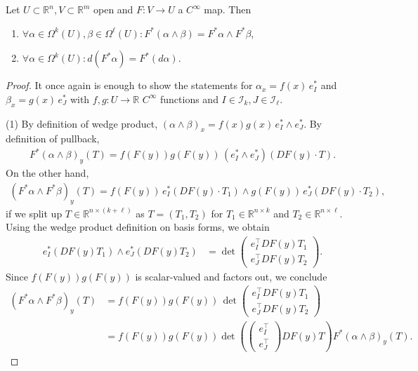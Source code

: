 \begin{prop}\label{prop:pullback-commutes}
	Let $U \subset \mathbb{R}^{n}, V \subset \mathbb{R}^{m}$ open and $F: V \to U$ a $C^{\infty}$ map. Then
	\begin{enumerate}
		\item $\forall \alpha \in \Omega^{k}(U), \beta \in \Omega^{\ell}(U): F^*(\alpha \wedge \beta ) = F^*\alpha \wedge F^*\beta $,
		\item $\forall \alpha \in \Omega^{k}(U): d(F^*\alpha ) = F^*(d \alpha )$.
	\end{enumerate}
\end{prop}
\begin{proof}
	It once again is enough to show the statements for $\alpha_{x} = f(x) \,e_{I}^*$ and $\beta_{x} = g(x) \, e_{J}^*$ with $f,g: U \to \mathbb{R}$ $C^{\infty}$ functions and $I \in \mathcal{I}_{k}, J \in \mathcal{I}_{\ell}$.

	(1) By definition of wedge product, $(\alpha \wedge \beta )_{x} = f(x)g(x)\, e_{I}^* \wedge e_{J}^*$.
	By definition of pullback,
	\begin{align*}
		F^*(\alpha \wedge \beta)_y(T)
		= f(F(y))g(F(y)) \, (e_{I}^* \wedge e_{J}^*)(DF(y)\cdot T).
	\end{align*}
	On the other hand,
	\begin{align*}
		(F^*\alpha \wedge F^*\beta )_y(T)
		= f(F(y)) \, e_{I}^*(DF(y)\cdot T_{1}) \wedge g(F(y)) \, e_{J}^*(DF(y)\cdot T_{2}),
	\end{align*}
	if we split up $T \in \mathbb{R}^{n \times (k+\ell)}$ as $T = (T_{1}, T_{2})$ for $T_{1} \in \mathbb{R}^{n \times k}$ and $T_{2} \in \mathbb{R}^{n \times \ell}$. Using the wedge product definition on basis forms, we obtain
	\begin{align*}
		e_{I}^*(DF(y) T_{1}) \wedge e_{J}^*(DF(y) T_{2})
		 & =
		\det\!\begin{pmatrix}
			      e_{I}^\top DF(y)T_{1} \\
			      e_{J}^\top DF(y)T_{2}
		      \end{pmatrix}.
	\end{align*}
	Since $f(F(y))g(F(y))$ is scalar-valued and factors out, we conclude
	\begin{align*}
		(F^*\alpha \wedge F^*\beta )_y(T)
		 & = f(F(y))g(F(y)) \,
		\det\!\begin{pmatrix}
			      e_{I}^\top DF(y) T_{1} \\
			      e_{J}^\top DF(y) T_{2}
		      \end{pmatrix}
		\\ &
		=
		f(F(y)) g(F(y)) \det \! \left(
		\begin{pmatrix}
			e_{I}^\top \\
			e_{J}^\top
		\end{pmatrix}
		DF(y)T \right)
		F^*(\alpha \wedge \beta)_y(T).
	\end{align*}


\end{proof}
